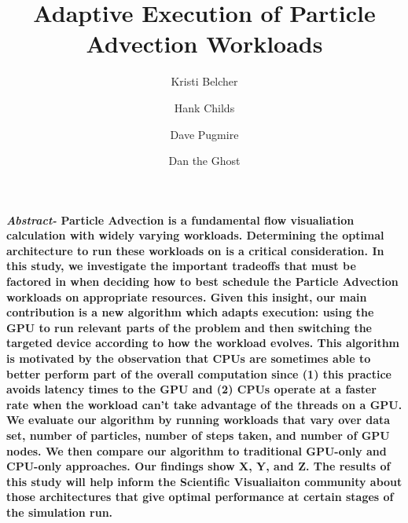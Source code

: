 \documentclass{IEEEtran}
\title{Adaptive Execution of Particle Advection Workloads}
\author[*]{Kristi Belcher}
\author[*]{Hank Childs}
\author[**]{Dave Pugmire}
\author[**]{Dan the Ghost}
\affil[*]{University of Oregon}
\affil[**]{Oak Ridge National Lab}
\begin{document}
\maketitle
%
\textbf{\textit{Abstract-} Particle Advection is a fundamental flow visualiation calculation with widely varying workloads. 
%
Determining the optimal architecture to run these workloads on is a critical consideration. 
%
In this study, we investigate the important tradeoffs that must be factored in when deciding how to best schedule the Particle Advection workloads on appropriate resources. 
%
Given this insight, our main contribution is a new algorithm which adapts execution: using the GPU to run relevant parts of the problem and then switching the targeted device according to how the workload evolves.
%
This algorithm is motivated by the observation that CPUs are sometimes able to better perform part of the overall computation since (1) this practice avoids latency times to the GPU and (2) CPUs operate at a faster rate when the workload can't take advantage of the threads on a GPU.
%
We evaluate our algorithm by running workloads that vary over data set, number of particles, number of steps taken, and number of GPU nodes.
%
We then compare our algorithm to traditional GPU-only and CPU-only approaches.
%
Our findings show X, Y, and Z.
%
The results of this study will help inform the Scientific Visualiaiton community about those architectures that give optimal performance at certain stages of the simulation run.}
%
\end{document}
